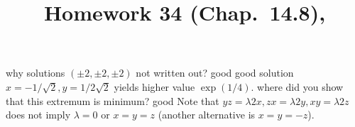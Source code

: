 \documentclass[pstricks,10pt,dvipsnames]{article} %
\title{Homework 34 (Chap.~14.8),
}
\begin{document}
\maketitle
{}
why solutions $(\pm2,\pm2,\pm2)$ not written out?
good
good
solution $x=-1/\sqrt{2},y=1/2\sqrt{2}$ yields higher value $\exp(1/4)$.
where did you show that this extremum is minimum?
good
Note that $yz=\lambda 2x,zx=\lambda2y,xy=\lambda2z$ does not imply $\lambda=0$ or $x=y=z$
(another alternative is $x=y=-z$).
\end{document}
